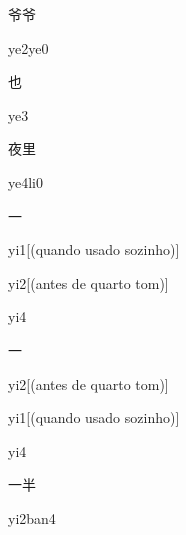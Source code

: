 \begin{verbete}[ye2ye0]{爷爷}
\begin{pronuncia}{ye2ye0}
\end{pronuncia}
\end{verbete}

\begin{verbete}[ye3]{也}
\begin{pronuncia}{ye3}
\end{pronuncia}
\end{verbete}

\begin{verbete}[ye4li0]{夜里}
\begin{pronuncia}{ye4li0}
\end{pronuncia}
\end{verbete}

\begin{verbete}[yi1]{一}
\begin{pronuncia}{yi1}[(quando usado sozinho)]
\end{pronuncia}
\begin{pronuncia}{yi2}[(antes de quarto tom)]
\end{pronuncia}
\begin{pronuncia}{yi4}
\end{pronuncia}
\end{verbete}

\begin{verbete}[yi2]{一}
\begin{pronuncia}{yi2}[(antes de quarto tom)]
\end{pronuncia}
\begin{pronuncia}{yi1}[(quando usado sozinho)]
\end{pronuncia}
\begin{pronuncia}{yi4}
\end{pronuncia}
\end{verbete}

\begin{verbete}[yi2ban4]{一半}
\begin{pronuncia}{yi2ban4}
\end{pronuncia}
\end{verbete}

